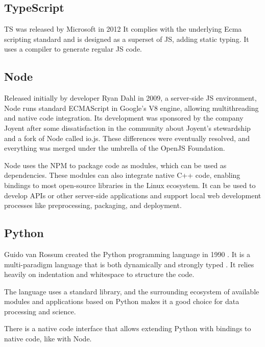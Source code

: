 \subsection{TypeScript}

\ac{TS} was released by Microsoft in 2012  It complies with the underlying Ecma scripting standard and is designed as a superset of \ac{JS}, adding static typing. It uses a compiler to generate regular \ac{JS} code.

\subsection{Node}

Released initially by developer Ryan Dahl in 2009, a server-side \ac{JS} environment, Node runs standard ECMAScript in Google's V8 engine, allowing multithreading and native code integration. Its development was sponsored by the company Joyent after some dissatisfaction in the community about Joyent's stewardship and a fork of Node called io.js. These differences were eventually resolved, and everything was merged under the umbrella of the OpenJS Foundation.

Node uses the \ac{NPM} to package code as modules, which can be used as dependencies. These modules can also integrate native C++ code, enabling bindings to most open-source libraries in the Linux ecosystem. It can be used to develop \ac{API}s or other server-side applications and support local web development processes like preprocessing, packaging, and deployment.

\subsection{Python}

Guido van Rossum created the Python programming language in 1990 \parencite{pythonHistory}. It is a multi-paradigm language that is both dynamically and strongly typed \parencite{pythonTyping}. It relies heavily on indentation and whitespace to structure the code.

The language uses a standard library, and the surrounding ecosystem of available modules and applications based on Python makes it a good choice for data processing and science.

There is a native code interface that allows extending Python with bindings to native code, like with Node.


